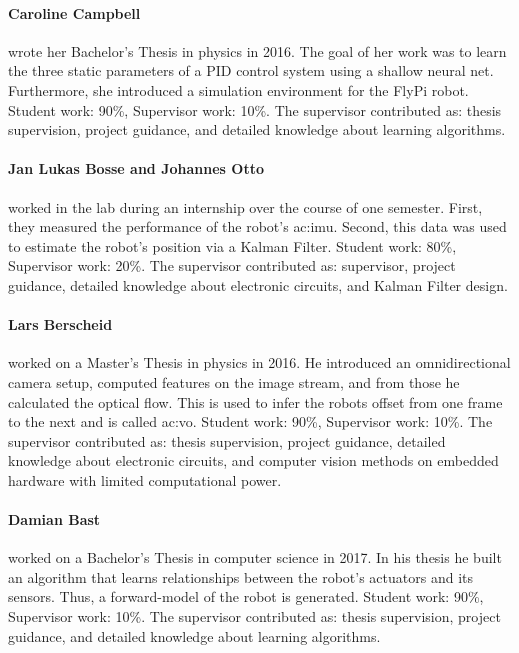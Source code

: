 \paragraph{Caroline Campbell} wrote her Bachelor's Thesis in physics in 2016.
The goal of her work was to learn the three static parameters of a PID control system using a shallow neural net.
Furthermore, she introduced a simulation environment for the FlyPi robot.
Student work: 90\%, Supervisor work: 10\%.
The supervisor contributed as: thesis supervision, project guidance, and detailed knowledge about learning algorithms.

\paragraph{Jan Lukas Bosse and Johannes Otto} worked in the lab during an internship over the course of one semester.
First, they measured the performance of the robot's \gls{ac:imu}.
Second, this data was used to estimate the robot's position via a Kalman Filter.
Student work: 80\%, Supervisor work: 20\%.
The supervisor contributed as: supervisor, project guidance, detailed knowledge about electronic circuits, and Kalman Filter design.

\paragraph{Lars Berscheid} worked on a Master's Thesis in physics in 2016.
He introduced an omnidirectional camera setup, computed features on the image stream, and from those he calculated the optical flow.
This is used to infer the robots offset from one frame to the next and is called \gls{ac:vo}.
Student work: 90\%, Supervisor work: 10\%.
The supervisor contributed as: thesis supervision, project guidance, detailed knowledge about electronic circuits, and computer vision methods on embedded hardware with limited computational power.

\paragraph{Damian Bast} worked on a Bachelor's Thesis in computer science in 2017.
In his thesis he built an algorithm that learns relationships between the robot's actuators and its sensors.
Thus, a forward-model of the robot is generated.
Student work: 90\%, Supervisor work: 10\%.
The supervisor contributed as: thesis supervision, project guidance, and detailed knowledge about learning algorithms.

